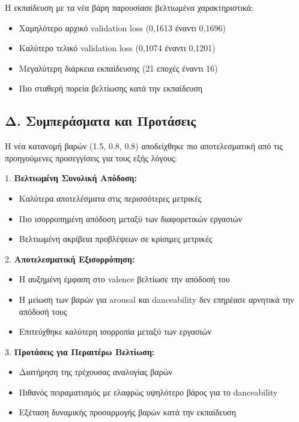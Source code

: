 \documentclass[a4paper,12pt]{article}
\begin{document}
Η εκπαίδευση με τα νέα βάρη παρουσίασε βελτιωμένα χαρακτηριστικά:

\begin{itemize}
    \item Χαμηλότερο αρχικό validation loss (0,1613 έναντι 0,1696)
    \item Καλύτερο τελικό validation loss (0,1074 έναντι 0,1201)
    \item Μεγαλύτερη διάρκεια εκπαίδευσης (21 εποχές έναντι 16)
    \item Πιο σταθερή πορεία βελτίωσης κατά την εκπαίδευση
\end{itemize}

\subsection*{Δ. Συμπεράσματα και Προτάσεις}

Η νέα κατανομή βαρών (1.5, 0.8, 0.8) αποδείχθηκε πιο αποτελεσματική από τις προηγούμενες προσεγγίσεις για τους εξής λόγους:

1. \textbf{Βελτιωμένη Συνολική Απόδοση:}
   \begin{itemize}
    \item Καλύτερα αποτελέσματα στις περισσότερες μετρικές
    \item Πιο ισορροπημένη απόδοση μεταξύ των διαφορετικών εργασιών
    \item Βελτιωμένη ακρίβεια προβλέψεων σε κρίσιμες μετρικές
   \end{itemize}

2. \textbf{Αποτελεσματική Εξισορρόπηση:}
   \begin{itemize}
    \item Η αυξημένη έμφαση στο valence βελτίωσε την απόδοσή του
    \item Η μείωση των βαρών για arousal και danceability δεν επηρέασε αρνητικά την απόδοσή τους
    \item Επιτεύχθηκε καλύτερη ισορροπία μεταξύ των εργασιών
   \end{itemize}

3. \textbf{Προτάσεις για Περαιτέρω Βελτίωση:}
   \begin{itemize}
    \item Διατήρηση της τρέχουσας αναλογίας βαρών
    \item Πιθανός πειραματισμός με ελαφρώς υψηλότερο βάρος για το danceability
    \item Εξέταση δυναμικής προσαρμογής βαρών κατά την εκπαίδευση
   \end{itemize}




\end{document}
